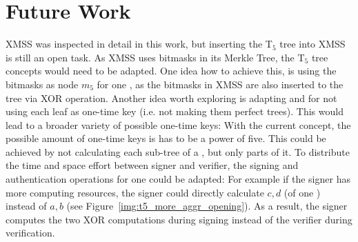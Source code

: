 \section{Future Work}
XMSS was inspected in detail in this work, but inserting the T$_5$ tree into XMSS is still an open task. As XMSS uses bitmasks in its Merkle Tree, the T$_5$ tree concepts would need to be adapted. One idea how to achieve this, is using the bitmasks as node $m_5$ for one \tftree, as the bitmasks in XMSS are also inserted to the tree via XOR operation.
Another idea worth exploring is adapting \tftree and \extree for not using each leaf as one-time key (i.e. not making them perfect trees). This would lead to a broader variety of possible one-time keys: With the current concept, the possible amount of one-time keys is has to be a power of five. This could be achieved by not calculating each sub-tree of a \tftree, but only parts of it.
To distribute the time and space effort between signer and verifier, the signing and authentication operations for one \tfblock could be adapted: 
For example if the signer has more computing resources, the signer could directly calculate $c,d$ (of one \tfblock) instead of $a,b$ (see Figure~\ref{img:t5_more_aggr_opening}). As a result, the signer computes the two XOR computations during signing instead of the verifier during verification.
